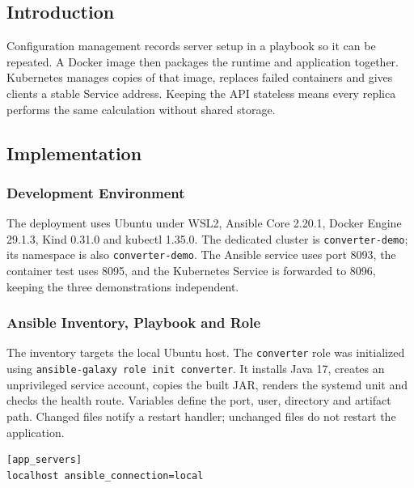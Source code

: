 \documentclass[12pt,a4paper]{article}
\begin{document}
\subsection*{Introduction}
Configuration management records server setup in a playbook so it can be repeated. A Docker image then packages the runtime and application together. Kubernetes manages copies of that image, replaces failed containers and gives clients a stable Service address. Keeping the API stateless means every replica performs the same calculation without shared storage.

\subsection*{Implementation}
\subsubsection*{Development Environment}
The deployment uses Ubuntu under WSL2, Ansible Core 2.20.1, Docker Engine 29.1.3, Kind 0.31.0 and kubectl 1.35.0. The dedicated cluster is \texttt{converter-demo}; its namespace is also \texttt{converter-demo}. The Ansible service uses port 8093, the container test uses 8095, and the Kubernetes Service is forwarded to 8096, keeping the three demonstrations independent.

\subsubsection*{Ansible Inventory, Playbook and Role}
The inventory targets the local Ubuntu host. The \texttt{converter} role was initialized using \texttt{ansible-galaxy role init converter}. It installs Java 17, creates an unprivileged service account, copies the built JAR, renders the systemd unit and checks the health route. Variables define the port, user, directory and artifact path. Changed files notify a restart handler; unchanged files do not restart the application.

\par\medskip{}\noindent\textbf{}\par\smallskip

\begin{lstlisting}
[app_servers]
localhost ansible_connection=local
\end{lstlisting}

\par\medskip{}\noindent\textbf{}\par\smallskip
\end{document}
